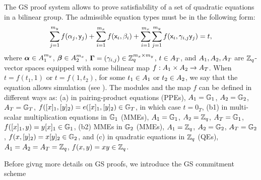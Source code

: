 The GS proof system allows to prove satisfiability of a set of quadratic equations in a bilinear group. The admissible equation types must be in the following form:
\begin{equation}\label{gseq}
\sum_{j=1}^{m_y} f(\alpha_j, \mathsf{y}_j)+\sum_{i=1}^{m_x} f(\mathsf{x}_i, \beta_i)+\sum_{i=1}^{m_x} \sum_{j=1}^{m_y}  f(\mathsf{x}_i,\gamma_{i,j} \mathsf{y}_j)=t,
\end{equation}
 where $\boldsymbol \alpha  \in A_1^{m_y}$, $\boldsymbol \beta  \in A_2^{m_x}$, $\mathbf{{\Gamma}}=(\gamma_{i,j}) \in \mathbb{Z}_q^{m_x\times m_y}$, $t \in A_T$, and $A_1,A_2,A_T$ are $\mathbb{Z}_q$-vector spaces equipped with some bilinear map $f:A_1\times A_2 \rightarrow A_T$. When $t=f(t_1,1)$ or $t=f(1,t_2)$, for some $t_1\in A_1$ or $t_2\in A_2$, we say that the equation allows simulation (see \cite{SIAM:GroSah12}). The modules and the map $f$ can be defined in different ways as: (a) in pairing-product equations (PPEs), $A_1=\mathbb{G}_1$, $A_2=\mathbb{G}_2$, $A_T=\mathbb{G}_T$, $f([x]_1,[y]_2)=e([x]_1,[y]_2) \in \mathbb{G}_T$, in which case $t=0_{T}$, (b1) in multi-scalar multiplication equations in $\mathbb{G}_1$ (MMEs), $A_1=\mathbb{G}_1$, $A_2=\mathbb{Z}_q$, $A_T=\mathbb{G}_1$, $f([x]_1,y)=y [x]_1 \in \mathbb{G}_1$,  (b2) MMEs in $\mathbb{G}_2$ (MMEs),  $A_1=\mathbb{Z}_q$, $A_2=\mathbb{G}_2$, $A_T=\mathbb{G}_2$, $f(x,[y]_2)=x [y]_2 \in \mathbb{G}_2$, and (c) in quadratic equations in $\mathbb{Z}_q$ (QEs), $A_1=A_2=A_T=\mathbb{Z}_q$, $f(x,y)=xy \in \mathbb{Z}_q$. 

Before givng more details on GS proofs, we introduce the GS commitment scheme


